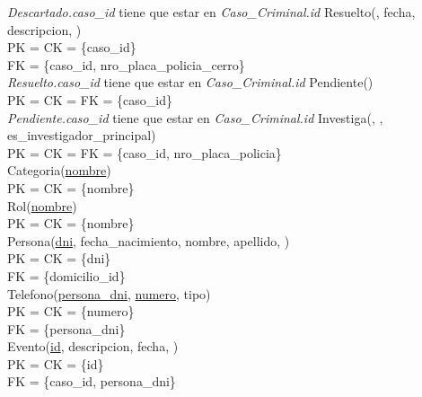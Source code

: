 \documentclass[10pt,a4paper]{article}
\begin{document}
\textit{Descartado.caso\_id} tiene que estar en \textit{Caso\_Criminal.id}
\newline
\newline
Resuelto(, fecha, descripcion, )\\ 
	PK = CK = \{caso\_id\}\\ 
	FK = \{caso\_id, nro\_placa\_policia\_cerro\}\\ 	
\newline
\textit{Resuelto.caso\_id} tiene que estar en \textit{Caso\_Criminal.id}
\newline
\newline
Pendiente()\\ 
  PK = CK = FK = \{caso\_id\}\\ 
\newline
\textit{Pendiente.caso\_id} tiene que estar en \textit{Caso\_Criminal.id}
\newline
\newline
Investiga(, , es_investigador\_principal)\\ 
  PK = CK = FK = \{caso\_id, nro\_placa\_policia\}\\ 
\newline
\newline
Categoria(\underline{nombre})\\ 
	PK = CK = \{nombre\}\\ 
\newline
Rol(\underline{nombre})\\ 
	PK = CK = \{nombre\}\\ 
\newline
Persona(\underline{dni}, fecha\_nacimiento, nombre, apellido, )\\ 
	PK = CK = \{dni\}\\ 
	FK = \{domicilio\_id\}\\ 
\newline
Telefono(\underline{\underline{persona\_dni}}, \underline{numero}, tipo)\\ 
	PK = CK = \{numero\}\\
	FK = \{persona\_dni\}\\ 
\newline
Evento(\underline{id}, descripcion, fecha, )\\ 
	PK = CK  = \{id\}\\ 
	FK = \{caso\_id, persona\_dni\}\\
\end{document}
